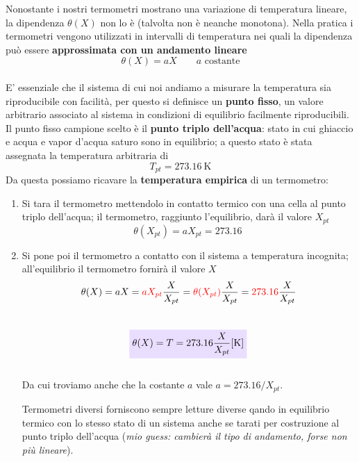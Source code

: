 \documentclass[x11names]{article}
\newcommand{\viola}[1]{\colorbox{myred}{$\displaystyle #1$}}
\begin{document}
	
	Nonostante i nostri termometri mostrano una variazione di temperatura lineare, la dipendenza \(\theta(X)\) non lo è (talvolta non è neanche monotona). Nella pratica i termometri vengono utilizzati in intervalli di temperatura nei quali la dipendenza può essere \textbf{approssimata con un andamento lineare} \\
	\[\theta(X) = aX \qquad a \text{ costante}\]\\
	E' essenziale che il sistema di cui noi andiamo a misurare la temperatura sia riproducibile con facilità, per questo si definisce un \textbf{punto fisso}, un valore arbitrario associato al sistema in condizioni di equilibrio facilmente riproducibili. Il punto fisso campione scelto è il \textbf{punto triplo dell'acqua}: stato in cui ghiaccio e acqua e vapor d'acqua saturo sono in equilibrio; a questo stato è stata assegnata la temperatura arbitraria di 
	\[ 
	T_{pt} = \SI{273.16}{\kelvin}
	\]
	Da questa possiamo ricavare la \textbf{temperatura empirica} di un termometro:
	\begin{enumerate}
	\item Si tara il termometro mettendolo in contatto termico con una cella al punto triplo dell'acqua; il termometro, raggiunto l'equilibrio, darà il valore \(X_{pt}\)
	\[ 
	\theta(X_{pt}) = aX_{pt} =  \SI{273.16}{}
	\]
	\item Si pone poi il termometro a contatto con il sistema a temperatura incognita; all'equilibrio il termometro fornirà il valore \(X\)
	\[ 
	\theta(X) = aX = \textcolor{red}{aX_{pt}}\frac{X}{X_{pt}} = \textcolor{red}{\theta(X_{pt})}\frac{X}{X_{pt}} = \textcolor{red}{273.16}\frac{X}{X_{pt}} 
	\]\\
	\begin{equation}\label{temperatura punto triplo}
		\viola{\theta(X) = T  = 273.16\frac{X}{X_{pt}} \SI{ }{[\kelvin]} }
	\end{equation}
	\\
	
	\noindent
	Da cui troviamo anche che la costante \(a\) vale \(a = 273.16/X_{pt}\).
	
	Termometri diversi forniscono sempre letture diverse qando in equilibrio termico con lo stesso stato di un sistema anche se tarati per costruzione al punto triplo dell'acqua (\textit{mio guess: cambierà il tipo di andamento, forse non più lineare}).
	
\end{enumerate}
\end{document}
